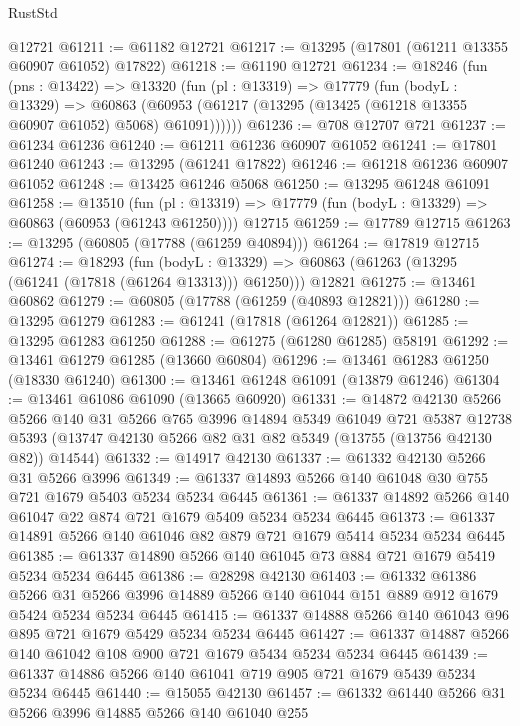 \begin{lexlean}{RustStd}
\begin{coremodule}
    @12721
@61211 := @61182 @12721
@61217 := @13295 (@17801 (@61211 @13355 @60907 @61052) @17822)
@61218 := @61190 @12721
@61234 := @18246
    (fun (pns : @13422) =>
    @13320
      (fun (pl : @13319) =>
      @17779
        (fun (bodyL : @13329) =>
        @60863 (@60953 (@61217 (@13295 (@13425 (@61218 @13355 @60907 @61052) @5068) @61091))))))
@61236 := @708 @12707 @721
@61237 := @61234 @61236
@61240 := @61211 @61236 @60907 @61052
@61241 := @17801 @61240
@61243 := @13295 (@61241 @17822)
@61246 := @61218 @61236 @60907 @61052
@61248 := @13425 @61246 @5068
@61250 := @13295 @61248 @61091
@61258 := @13510
    (fun (pl : @13319) => @17779 (fun (bodyL : @13329) => @60863 (@60953 (@61243 @61250))))
    @12715
@61259 := @17789 @12715
@61263 := @13295 (@60805 (@17788 (@61259 @40894)))
@61264 := @17819 @12715
@61274 := @18293
    (fun (bodyL : @13329) => @60863 (@61263 (@13295 (@61241 (@17818 (@61264 @13313))) @61250)))
    @12821
@61275 := @13461 @60862
@61279 := @60805 (@17788 (@61259 (@40893 @12821)))
@61280 := @13295 @61279
@61283 := @61241 (@17818 (@61264 @12821))
@61285 := @13295 @61283 @61250
@61288 := @61275 (@61280 @61285) @58191
@61292 := @13461 @61279 @61285 (@13660 @60804)
@61296 := @13461 @61283 @61250 (@18330 @61240)
@61300 := @13461 @61248 @61091 (@13879 @61246)
@61304 := @13461 @61086 @61090 (@13665 @60920)
@61331 := @14872
    @42130
    @5266
    @5266
    @140
    @31
    @5266
    @765
    @3996
    @14894
    @5349
    @61049
    @721
    @5387
    @12738
    @5393
    (@13747 @42130 @5266 @82 @31 @82 @5349 (@13755 (@13756 @42130 @82)) @14544)
@61332 := @14917 @42130
@61337 := @61332 @42130 @5266 @31 @5266 @3996
@61349 := @61337 @14893 @5266 @140 @61048 @30 @755 @721 @1679 @5403 @5234 @5234 @6445
@61361 := @61337 @14892 @5266 @140 @61047 @22 @874 @721 @1679 @5409 @5234 @5234 @6445
@61373 := @61337 @14891 @5266 @140 @61046 @82 @879 @721 @1679 @5414 @5234 @5234 @6445
@61385 := @61337 @14890 @5266 @140 @61045 @73 @884 @721 @1679 @5419 @5234 @5234 @6445
@61386 := @28298 @42130
@61403 := @61332
    @61386
    @5266
    @31
    @5266
    @3996
    @14889
    @5266
    @140
    @61044
    @151
    @889
    @912
    @1679
    @5424
    @5234
    @5234
    @6445
@61415 := @61337 @14888 @5266 @140 @61043 @96 @895 @721 @1679 @5429 @5234 @5234 @6445
@61427 := @61337 @14887 @5266 @140 @61042 @108 @900 @721 @1679 @5434 @5234 @5234 @6445
@61439 := @61337 @14886 @5266 @140 @61041 @719 @905 @721 @1679 @5439 @5234 @5234 @6445
@61440 := @15055 @42130
@61457 := @61332
    @61440
    @5266
    @31
    @5266
    @3996
    @14885
    @5266
    @140
    @61040
    @255

\end{coremodule}
\end{lexlean}
